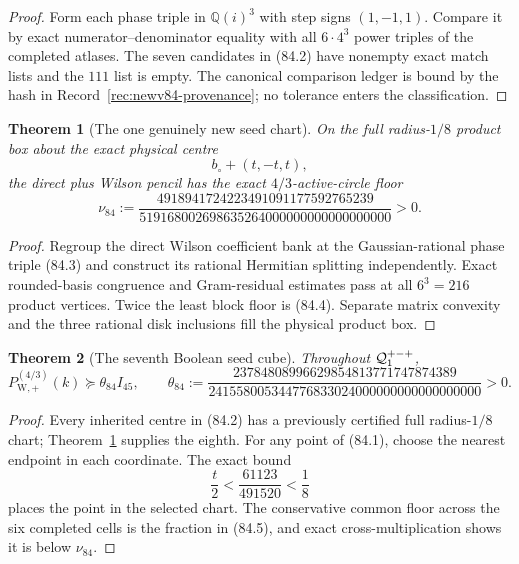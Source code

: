 \documentclass[11pt,oneside]{article}
\newtheorem{theorem}{Theorem}[section]
\theoremstyle{definition}
\theoremstyle{remark}
\begin{document}
\begin{proof}
Form each phase triple in \(\mathbb Q(i)^3\) with step signs
\((1,-1,1)\).  Compare it by exact numerator--denominator equality
with all \(6\cdot4^3\) power triples of the completed atlases.  The
seven candidates in (84.2) have nonempty exact match lists and the
\(111\) list is empty.  The canonical comparison ledger is bound by
the hash in Record~\ref{rec:newv84-provenance}; no tolerance enters
the classification.
\end{proof}

\begin{theorem}[The one genuinely new seed chart]
\label{thm:newv84-new-chart}
On the full radius-\(1/8\) product box about the exact physical
centre
\[
 b_\circ+(t,-t,t),                                    \tag{84.3}
\]
the direct plus Wilson pencil has the exact \(4/3\)-active-circle
floor
\[
\nu_{84}:=
\frac{4918941724223491091177592765239}
     {519168002698635264000000000000000000}>0.         \tag{84.4}
\]
\end{theorem}

\begin{proof}
Regroup the direct Wilson coefficient bank at the Gaussian-rational
phase triple (84.3) and construct its rational Hermitian splitting
independently.  Exact rounded-basis congruence and Gram-residual
estimates pass at all \(6^3=216\) product vertices.  Twice the
least block floor is (84.4).  Separate matrix convexity and the
three rational disk inclusions fill the physical product box.
\end{proof}

\begin{theorem}[The seventh Boolean seed cube]
\label{thm:newv84-seed-cube}
Throughout \({\cal Q}^{+-+}_1\),
\[
 P_{\mathrm W,+}^{(4/3)}(k)
 \succeq\theta_{84}I_{45},\qquad
 \theta_{84}:=
 \frac{23784808996629854813771747874389}
 {241558005344776833024000000000000000000}>0.         \tag{84.5}
\]
\end{theorem}

\begin{proof}
Every inherited centre in (84.2) has a previously certified full
radius-\(1/8\) chart; Theorem~\ref{thm:newv84-new-chart} supplies
the eighth.  For any point of (84.1), choose the nearest endpoint
in each coordinate.  The exact bound
\[
 \frac t2<\frac{61123}{491520}<\frac18                \tag{84.6}
\]
places the point in the selected chart.  The conservative common
floor across the six completed cells is the fraction in (84.5),
and exact cross-multiplication shows it is below \(\nu_{84}\).
\end{proof}
\end{document}
